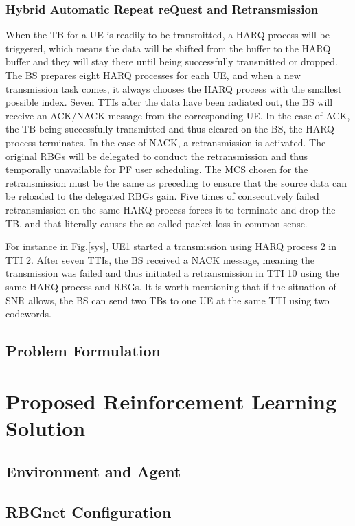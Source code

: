 \documentclass[journal]{IEEEtran}
\begin{document}
\subsubsection{Hybrid Automatic Repeat reQuest and Retransmission}
When the TB for a UE is readily to be transmitted, a HARQ process will be triggered, which means the data will be shifted from the buffer to the HARQ buffer and they will stay there until being successfully transmitted or dropped. The  BS prepares eight HARQ processes for each UE, and when a new transmission task comes, it always chooses the HARQ process with the smallest possible index. Seven TTIs after the data have been radiated out, the BS will receive an ACK/NACK message from the corresponding UE. In the case of ACK, the TB being successfully transmitted and thus cleared on the BS, the HARQ process terminates. In the case of NACK, a retransmission is activated. The original RBGs will be delegated to conduct the retransmission and thus temporally unavailable for PF user scheduling. The MCS chosen for the retransmission must be the same as preceding to ensure that the source data can be reloaded to the delegated RBGs gain. Five times of consecutively failed retransmission on the same HARQ process forces it to terminate and drop the TB, and that literally causes the so-called packet loss in common sense.

For instance in Fig.\ref{sys}, UE1 started a transmission using HARQ	process 2 in TTI 2. After seven TTIs, the BS received a NACK message, meaning the transmission was failed and thus initiated a retransmission in TTI 10 using the same HARQ process and RBGs.
It is worth mentioning that if the situation of SNR allows, the BS can send two TBs to one UE at the same TTI using two codewords.

\subsection{Problem Formulation}

\section{Proposed Reinforcement Learning Solution}

\subsection{Environment and Agent}

\subsection{RBGnet Configuration}
\end{document}
